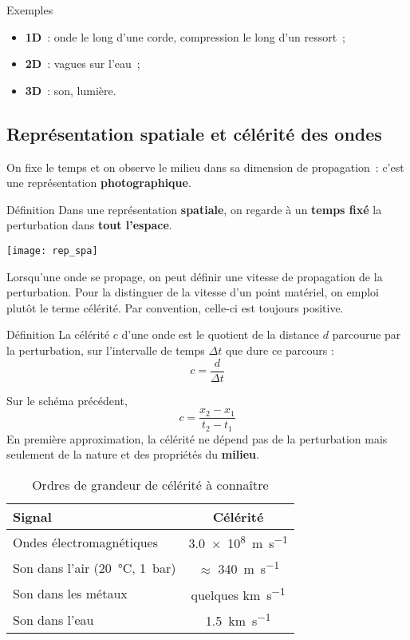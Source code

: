 \documentclass[../main/main.tex]{subfiles}
\begin{document}
\begin{rexem}{Exemples}
    \begin{itemize}
        \item \textbf{1D}~: onde le long d'une corde, compression le long d'un
            ressort~;
        \item \textbf{2D}~: vagues sur l'eau~;
        \item \textbf{3D}~: son, lumière.
    \end{itemize}
\end{rexem}

\subsection{Représentation spatiale et célérité des ondes}
On fixe le temps et on observe le milieu dans sa dimension de propagation~:
c'est une représentation \textbf{photographique}.

\begin{rdefi}{\tiny Définition}
    Dans une représentation \textbf{spatiale}, on regarde à un \textbf{temps
    fixé} la perturbation dans \textbf{tout l’espace}.
\end{rdefi}

\begin{center}
    \texttt{[image: rep\_spa]}
\end{center}

Lorsqu’une onde se propage, on peut définir une vitesse de propagation de la
perturbation. Pour la distinguer de la vitesse d’un point matériel, on emploi
plutôt le terme célérité. Par convention, celle-ci est toujours positive.

\begin{bdefi}{Définition}
    La célérité $c$ d’une onde est le quotient de la distance $d$ parcourue par la
    perturbation, sur l’intervalle de temps $\Delta t$ que dure ce parcours :
    \[\boxed{c = \frac{d}{\Delta t}}\]
\end{bdefi}

Sur le schéma précédent,
\[
    c = \frac{x_2-x_1}{t_2-t_1}
\]
En première approximation, la célérité ne dépend pas de la perturbation mais
seulement de la nature et des propriétés du \textbf{milieu}.
\begin{table}[h]
    \centering
    \caption{Ordres de grandeur de célérité à connaître}
    \label{tab:ctoknow}
    \begin{tabular}{lc}
        \toprule
        Signal & Célérité
        \\\midrule
        Ondes électromagnétiques & \SI{3.0e8}{m.s^{-1}}
        \\
        Son dans l'air (\SI{20}{\degreeCelsius}, \SI{1}{bar}) & $\approx$
        \SI{340}{m.s^{-1}}
        \\
        Son dans les métaux & quelques \si{km.s^{-1}}
        \\
        Son dans l'eau & \SI{1.5}{km.s^{-1}}
        \\\bottomrule
    \end{tabular}
\end{table}
\end{document}

